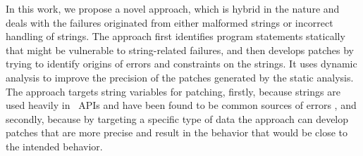 
In this work, we propose a novel approach, which is hybrid in the nature and
deals with the failures originated from either malformed strings or incorrect
handling of strings. The approach first identifies program statements statically
that might be vulnerable to string-related failures, and then develops patches
by trying to identify origins of errors and constraints on the strings. It uses dynamic
analysis to improve the precision of the patches generated by the static
analysis. The approach targets string variables for patching, firstly, because
strings are used heavily in \java\ APIs and have been found to be common sources
of errors \cite{}, and secondly, because by targeting a specific type of data
the approach can develop patches that are more precise and result in the
behavior that would be close to the intended behavior. %

